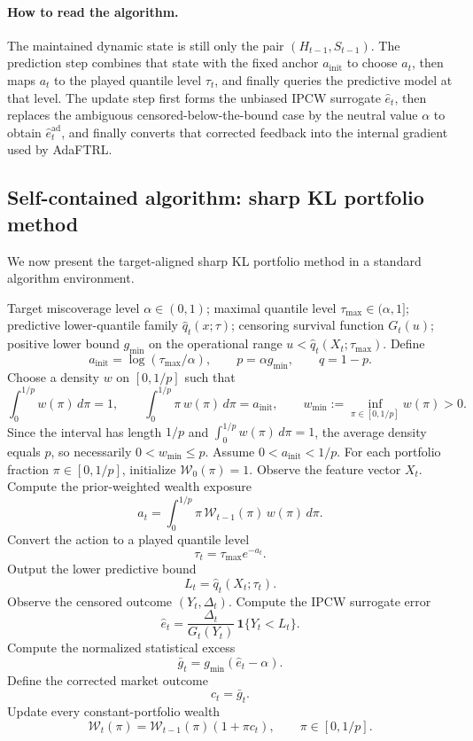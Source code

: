 \documentclass[11pt]{article}
\newcommand{\1}{\mathbf{1}}
\begin{document}
\paragraph{How to read the algorithm.}
The maintained dynamic state is still only the pair $(H_{t-1},S_{t-1})$. The prediction step combines that state with the fixed anchor \(a_{\mathrm{init}}\) to choose \(a_t\), then maps \(a_t\) to the played quantile level \(\tau_t\), and finally queries the predictive model at that level. The update step first forms the unbiased IPCW surrogate \(\hat e_t\), then replaces the ambiguous censored-below-the-bound case by the neutral value \(\alpha\) to obtain \(\hat e_t^{\mathrm{ad}}\), and finally converts that corrected feedback into the internal gradient used by AdaFTRL.



\subsection{Self-contained algorithm: sharp KL portfolio method}

We now present the target-aligned sharp KL portfolio method in a standard algorithm environment.

\begin{algorithm}[ht]
\caption{Survival Portfolio Method}
\begin{algorithmic}[1]
\Require Target miscoverage level $\alpha\in(0,1)$; maximal quantile level $\tau_{\max}\in(\alpha,1]$; predictive lower-quantile family $\hat q_t(x;\tau)$; censoring survival function $G_t(u)$; positive lower bound $g_{\min}$ on the operational range $u<\hat q_t(X_t;\tau_{\max})$.
\State Define
\[
a_{\mathrm{init}}=\log(\tau_{\max}/\alpha),
\qquad
p=\alpha g_{\min},
\qquad
q=1-p.
\]
\State Choose a density \(w\) on \([0,1/p]\) such that
\[
\int_0^{1/p} w(\pi)\,d\pi=1,
\qquad
\int_0^{1/p}\pi\,w(\pi)\,d\pi=a_{\mathrm{init}},
\qquad
w_{\min}:=\inf_{\pi\in[0,1/p]}w(\pi)>0.
\]
Since the interval has length \(1/p\) and \(\int_0^{1/p} w(\pi)\,d\pi=1\), the average density equals \(p\), so necessarily \(0<w_{\min}\le p\).
\State Assume \(0<a_{\mathrm{init}}<1/p\). For each portfolio fraction $\pi\in[0,1/p]$, initialize $\mathcal W_0(\pi)=1$.
  \State Observe the feature vector $X_t$.
  \State Compute the prior-weighted wealth exposure
  \[
  a_t
  =
  \int_0^{1/p}\pi\,\mathcal W_{t-1}(\pi)\,w(\pi)\,d\pi.
  \]
  \State Convert the action to a played quantile level
  \[
  \tau_t=\tau_{\max}e^{-a_t}.
  \]
  \State Output the lower predictive bound
  \[
  L_t=\hat q_t(X_t;\tau_t).
  \]
  \State Observe the censored outcome $(Y_t,\Delta_t)$.
  \State Compute the IPCW surrogate error
  \[
  \hat e_t=\frac{\Delta_t}{G_t(Y_t)}\,\1\{Y_t< L_t\}.
  \]
  \State Compute the normalized statistical excess
  \[
  \bar g_t=g_{\min}(\hat e_t-\alpha).
  \]
  \State Define the corrected market outcome
  \[
  c_t=\bar g_t.
  \]
  \State Update every constant-portfolio wealth
  \[
  \mathcal W_t(\pi)=\mathcal W_{t-1}(\pi)(1+\pi c_t),
  \qquad
  \pi\in[0,1/p].
  \]
\EndFor
\end{algorithmic}
\end{algorithm}
\end{document}
